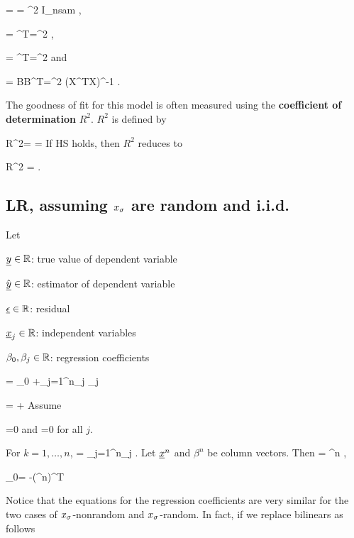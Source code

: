 \beq
{}=
=
\xi^2 I_{nsam}
\;,
\eeq

\beq
{}=
\V{}\V^T=\xi^2\V
\label{eq-homo}
\;,
\eeq

\beq
{}=
\A{}\A^T=\xi^2\A
\eeq
and

\beq
{}=
BB^T=\xi^2 (X^TX)^{-1}
\;.
\eeq

The goodness of fit
for this model
is often measured using  the
{\bf coefficient of determination}
$R^2$. $R^2$  is defined by


\beq
R^2=
=
\eeq
If HS holds, then
$R^2$ reduces to


\beq
R^2 =
\;.
\eeq

\subsection{LR, assuming
$x_\sigma$ are random and i.i.d.}
Let

${\underline{y}}\in{ \mathbb{R}}$:  true value
of dependent variable

$\hat{{\underline{y}}}\in{ \mathbb{R}}$: estimator
of dependent variable

$\underline{\epsilon}\in{ \mathbb{R}}$: residual

${\underline{x}}_j\in { \mathbb{R}}$: independent variables

$\beta_0, \beta_j\in{ \mathbb{R}}$:
regression coefficients

\beq
\hat{\rvy}=
\beta_0 +\sum_{j=1}^n\beta_j \rvx_j
\eeq

\beq
\rvy = \hat{\rvy}+\ul{\eps}
\eeq
Assume 

\beq
\av{\rveps}=0
\eeq
and
\beq
{}=0
\eeq
for all $j$.

For $k=1, \ldots, n$,
\beq
{}
=
\sum_{j=1}^n\beta_j
\;.
\eeq
Let ${\underline{x}}^n$ and $\beta^n$ be
column vectors.
Then
\beq
{}=
\beta^n
\;,
\eeq

\beq
{}
\label{eq-beta-random-lin-reg}
\eeq

\beq
\beta_0=
\av{\rvy}-(\beta^n)^T 
\eeq

Notice that 
the equations for the regression coefficients
are very similar
for the two cases of $x_\sigma$-nonrandom
and $x_\sigma$-random.
In fact, if  we replace bilinears as follows

